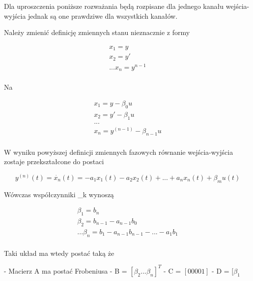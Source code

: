 \documentclass{article}
\begin{document}
	Dla uproszczenia poniższe rozważania będą rozpisane dla jednego kanału
	wejścia-wyjścia jednak są one prawdziwe dla wszystkich kanałów.

	Należy zmienić definicję zmiennych stanu nieznacznie z formy

	\begin{equation}
		\begin{aligned}

			 x_{1} = y  \\
			 x_{2} = y' \\
			...
			 x_{n} = y^{n-1} \\

		\end{aligned}
	\end{equation}

	Na

	\begin{equation}
		\begin{aligned}

			 x_{1} = y - \beta_{0}u \\
			 x_{2} = y' - \beta_{1}u \\
			... \\
			 x_{n} = y^{(n-1)} - \beta_{n-1}u \\

		\end{aligned}
	\end{equation}

	W wyniku powyższej definicji zmiennych fazowych równanie wejścia-wyjścia
	zostaje przekształcone do postaci

	\begin{equation}

		y^{(n)}(t) = \dot{x_{n}}(t) = -a_{1}x_{1}(t) - a_{2}x_{2}(t) + ... + a_{n}x_{n}(t) + \beta_{m}u(t) 

	\end{equation}

	Wówczas współczynniki \beta_{k} wynoszą

	\begin{equation}
		\begin{aligned}

			 \beta_{1} = b_{n} \\
			 \beta_{2} = b_{n-1} - a_{n-1}b_{0}\\
			...
			 \beta_{n} = b_{1} - a_{n-1}b_{n-1} - ... - a_{1}b_{1}\\

		\end{aligned}
	\end{equation}

	Taki układ ma wtedy postać taką że

	- Macierz A ma postać Frobeniusa
	- B = $[\beta_{2} ... \beta_{n}]^{T}$
	- C = $[0 0 0 0 1]$
	- D = $[\beta_{1}$
\end{document}
